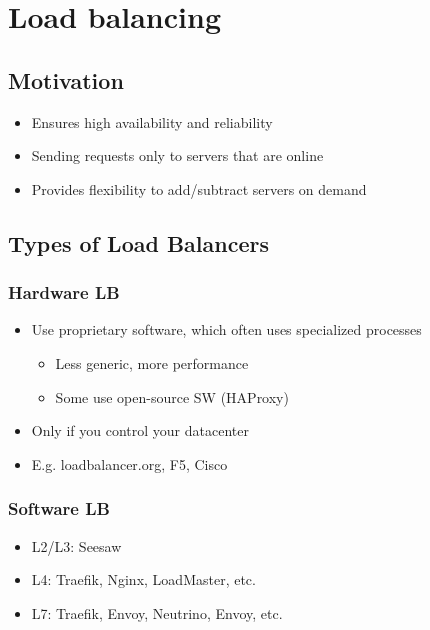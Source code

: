 

\section{Load balancing}

\subsection{Motivation}
\begin{itemize}
    \item Ensures high availability and reliability
    \item Sending requests only to servers that are online
    \item Provides flexibility to add/subtract servers on demand
\end{itemize}


\subsection{Types of Load Balancers}

\subsubsection{Hardware LB}
\begin{itemize}
    \item Use proprietary software, which often uses specialized processes
    \begin{itemize}
        \item Less generic, more performance
        \item Some use open-source SW (HAProxy)
    \end{itemize}
    \item Only if you control your datacenter
    \item E.g. loadbalancer.org, F5, Cisco
\end{itemize}

\subsubsection{Software LB}
\begin{itemize}
    \item L2/L3: Seesaw
    \item L4: Traefik, Nginx, LoadMaster, etc.
    \item L7: Traefik, Envoy, Neutrino, Envoy, etc.
\end{itemize}
